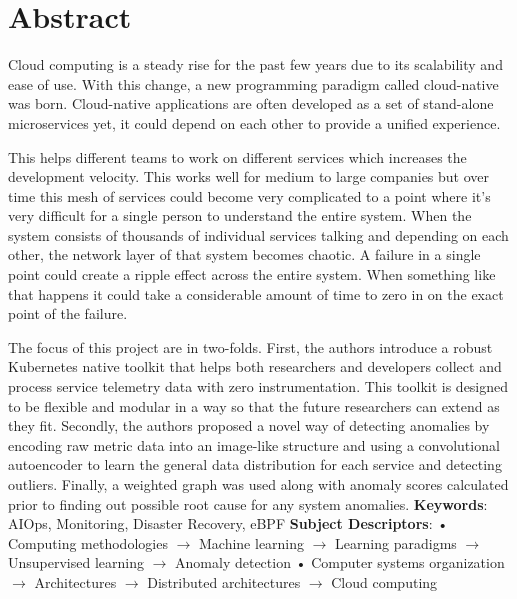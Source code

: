 \chapter*{Abstract}


Cloud computing is a steady rise for the past few years due to its scalability and ease of use. With this change, a new programming paradigm called cloud-native was born. Cloud-native applications are often developed as a set of stand-alone microservices yet, it could depend on each other to provide a unified experience. 

This helps different teams to work on different services which increases the development velocity. This works well for medium to large companies but over time this mesh of services could become very complicated to a point where it's very difficult for a single person to understand the entire system. When the system consists of thousands of individual services talking and depending on each other, the network layer of that system becomes chaotic. A failure in a single point could create a ripple effect across the entire system. When something like that happens it could take a considerable amount of time to zero in on the exact point of the failure.

The focus of this project are in two-folds. First, the authors introduce a robust Kubernetes native toolkit that helps both researchers and developers collect and process service telemetry data with zero instrumentation. This toolkit is designed to be flexible and modular in a way so that the future researchers can extend as they fit. Secondly, the authors proposed a novel way of detecting anomalies by encoding raw metric data into an image-like structure and using a convolutional autoencoder to learn the general data distribution for each service and detecting outliers. Finally, a weighted graph was used along with anomaly scores calculated prior to finding out possible root cause for any system anomalies.
\newline
\newline
\textbf{Keywords}:
AIOps, Monitoring, Disaster Recovery, eBPF
\newline
\textbf{Subject Descriptors}:
• Computing methodologies $\rightarrow$ Machine learning $\rightarrow$ Learning paradigms $\rightarrow$ Unsupervised learning $\rightarrow$ Anomaly detection • Computer systems organization $\rightarrow$ Architectures $\rightarrow$ Distributed architectures $\rightarrow$ Cloud computing